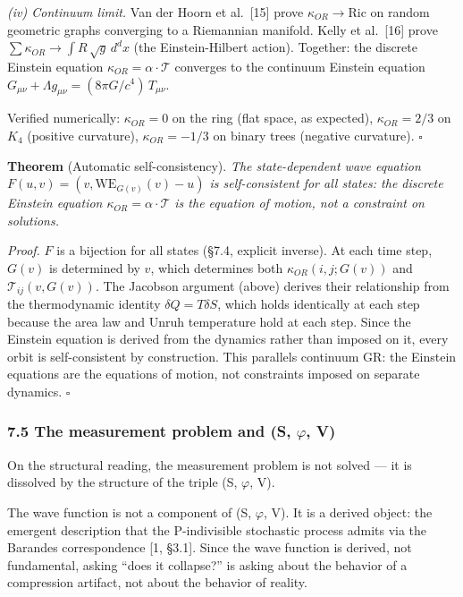 \documentclass[
  11pt,
]{article}
\begin{document}
\emph{(iv) Continuum limit.} Van der Hoorn et al.~{[}15{]} prove
\(\kappa_{OR} \to \mathrm{Ric}\) on random geometric graphs converging
to a Riemannian manifold. Kelly et al.~{[}16{]} prove
\(\sum \kappa_{OR} \to \int R\,\sqrt{g}\,d^dx\) (the Einstein-Hilbert
action). Together: the discrete Einstein equation
\(\kappa_{OR} = \alpha \cdot \mathcal{T}\) converges to the continuum
Einstein equation
\(G_{\mu\nu} + \Lambda g_{\mu\nu} = (8\pi G/c^4)\,T_{\mu\nu}\).

Verified numerically: \(\kappa_{OR} = 0\) on the ring (flat space, as
expected), \(\kappa_{OR} = 2/3\) on \(K_4\) (positive curvature),
\(\kappa_{OR} = -1/3\) on binary trees (negative curvature). \(\square\)

\textbf{Theorem} (Automatic self-consistency). \emph{The state-dependent
wave equation \(F(u, v) = (v, \mathrm{WE}_{G(v)}(v) - u)\) is
self-consistent for all states: the discrete Einstein equation
\(\kappa_{OR} = \alpha \cdot \mathcal{T}\) is the equation of motion,
not a constraint on solutions.}

\emph{Proof.} \(F\) is a bijection for all states (§7.4, explicit
inverse). At each time step, \(G(v)\) is determined by \(v\), which
determines both \(\kappa_{OR}(i,j; G(v))\) and
\(\mathcal{T}_{ij}(v, G(v))\). The Jacobson argument (above) derives
their relationship from the thermodynamic identity
\(\delta Q = T\delta S\), which holds identically at each step because
the area law and Unruh temperature hold at each step. Since the Einstein
equation is derived from the dynamics rather than imposed on it, every
orbit is self-consistent by construction. This parallels continuum GR:
the Einstein equations are the equations of motion, not constraints
imposed on separate dynamics. \(\square\)

\hypertarget{the-measurement-problem-and-s-ux3c6-v}{%
\subsubsection{7.5 The measurement problem and (S, \ensuremath{\varphi},
V)}\label{the-measurement-problem-and-s-ux3c6-v}}

On the structural reading, the measurement problem is not solved --- it
is dissolved by the structure of the triple (S, \ensuremath{\varphi}, V).

The wave function is not a component of (S, \ensuremath{\varphi}, V). It is a derived
object: the emergent description that the P-indivisible stochastic
process admits via the Barandes correspondence {[}1, §3.1{]}. Since the
wave function is derived, not fundamental, asking ``does it collapse?''
is asking about the behavior of a compression artifact, not about the
behavior of reality.
\end{document}

